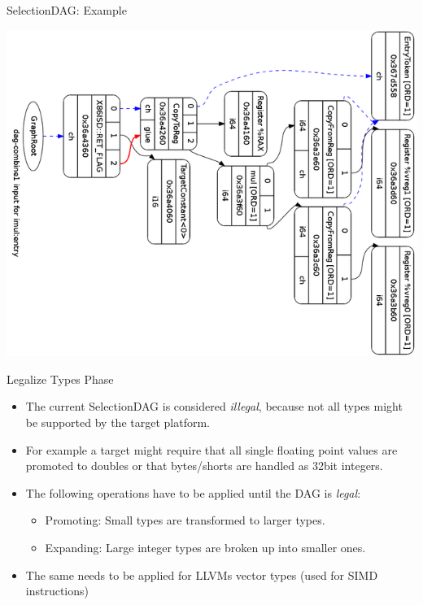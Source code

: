 \documentclass[]{beamer}
\begin{document}
\begin{frame}{SelectionDAG: Example}
  \begin{center}
  \includegraphics[width=.8\textwidth]{pictures/sdag_mul}
  \end{center}
\end{frame}

\begin{frame}{Legalize Types Phase}
\begin{itemize}
    \item The current SelectionDAG is considered \textit{illegal}, because not all types might be supported
          by the target platform.
    \item For example a target might require that all single floating point values are promoted to doubles
          or that bytes/shorts are handled as 32bit integers.
    \item The following operations have to be applied until the DAG is \textit{legal}:
          \begin{itemize}
            \item Promoting: Small types are transformed to larger types.
            \item Expanding: Large integer types are broken up into smaller ones.
          \end{itemize}
    \item The same needs to be applied for LLVMs vector types (used for SIMD instructions)
\end{itemize}
\end{frame}
\end{document}
